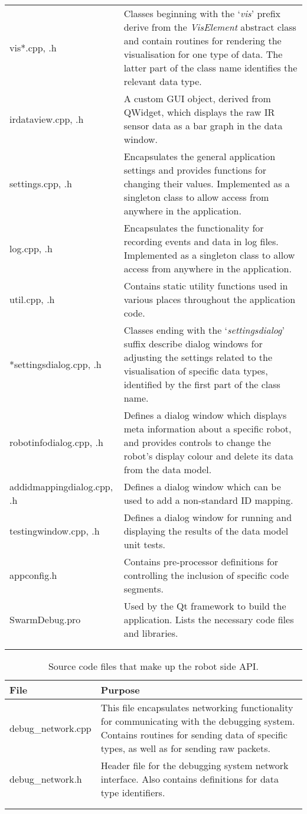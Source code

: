 \begin{longtable}{ l p{10cm} }
 vis*.cpp, .h & Classes beginning with the `\textit{vis}' prefix derive from the \textit{VisElement} abstract class and contain routines for rendering the visualisation for one type of data. The latter part of the class name identifies the relevant data type.\\
 irdataview.cpp, .h & A custom GUI object, derived from QWidget, which displays the raw IR sensor data as a bar graph in the data window.\\
 settings.cpp, .h & Encapsulates the general application settings and provides functions for changing their values. Implemented as a singleton class to allow access from anywhere in the application.\\
 log.cpp, .h & Encapsulates the functionality for recording events and data in log files. Implemented as a singleton class to allow access from anywhere in the application.\\
 util.cpp, .h & Contains static utility functions used in various places throughout the application code.\\
 *settingsdialog.cpp, .h & Classes ending with the `\textit{settingsdialog}' suffix describe dialog windows for adjusting the settings related to the visualisation of specific data types, identified by the first part of the class name.\\
 robotinfodialog.cpp, .h & Defines a dialog window which displays meta information about a specific robot, and provides controls to change the robot's display colour and delete its data from the data model.\\
 addidmappingdialog.cpp, .h & Defines a dialog window which can be used to add a non-standard ID mapping.\\
 testingwindow.cpp, .h & Defines a dialog window for running and displaying the results of the data model unit tests.\\
 appconfig.h & Contains pre-processor definitions for controlling the inclusion of specific code segments.\\
 SwarmDebug.pro & Used by the Qt framework to build the application. Lists the necessary code files and libraries.\\
 \bottomrule\\
	
 \label{tab:CodeFiles}
\end{longtable}

\begin{longtable}{ l p{10cm} }
\caption[Robot-side Code Files]{Source code files that make up the robot side API.}\\
 File & Purpose\\
 \hline
 debug\_network.cpp & This file encapsulates networking functionality for communicating with the debugging system. Contains routines for sending data of specific types, as well as for sending raw packets.\\
 debug\_network.h & Header file for the debugging system network interface. Also contains definitions for data type identifiers.\\
 \bottomrule\\
	
 \label{tab:RobotCodeFiles}
\end{longtable}